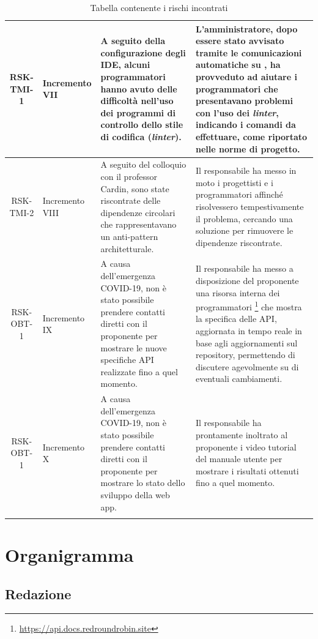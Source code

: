 \begin{center}
\begin{longtable}{|c|p{3cm}|p{4cm}|p{4cm}|}
			\hline
			RSK-TMI-1 & Incremento VII & A seguito della configurazione degli IDE, alcuni programmatori hanno avuto delle difficoltà nell'uso dei programmi di controllo dello stile di codifica (\textit{linter}). & L'amministratore, dopo essere stato avvisato tramite le comunicazioni automatiche su \glock{Slack}, ha provveduto ad aiutare i programmatori che presentavano problemi con l'uso dei \textit{linter}, indicando i comandi da effettuare, come riportato nelle norme di progetto. \\
			\hline
			RSK-TMI-2 & Incremento VIII & A seguito del colloquio con il professor Cardin, sono state riscontrate delle dipendenze circolari che rappresentavano un anti-pattern architetturale. & Il responsabile ha messo in moto i progettisti e i programmatori affinché risolvessero tempestivamente il problema, cercando una soluzione per rimuovere le dipendenze riscontrate. \\
			\hline
			RSK-OBT-1 & Incremento IX & A causa dell'emergenza COVID-19, non è stato possibile prendere contatti diretti con il proponente per mostrare le nuove specifiche API realizzate fino a quel momento. & Il responsabile ha messo a disposizione del proponente una risorsa interna dei programmatori \footnote{\href{api.docs.redroundrobin.site}{https://api.docs.redroundrobin.site}} che mostra la specifica delle API, aggiornata in tempo reale in base agli aggiornamenti sul repository, permettendo di discutere agevolmente su \glock{Slack} di eventuali cambiamenti. \\
			\hline
			RSK-OBT-1 & Incremento X & A causa dell'emergenza COVID-19, non è stato possibile prendere contatti diretti con il proponente per mostrare lo stato dello sviluppo della web app. & Il responsabile ha prontamente inoltrato al proponente i video tutorial del manuale utente per mostrare i risultati ottenuti fino a quel momento. \\
			\hline

			\caption{Tabella contenente i rischi incontrati}
			\end{longtable}
		\end{center}

	\section{Organigramma}
		
		\subsection{Redazione}
			
